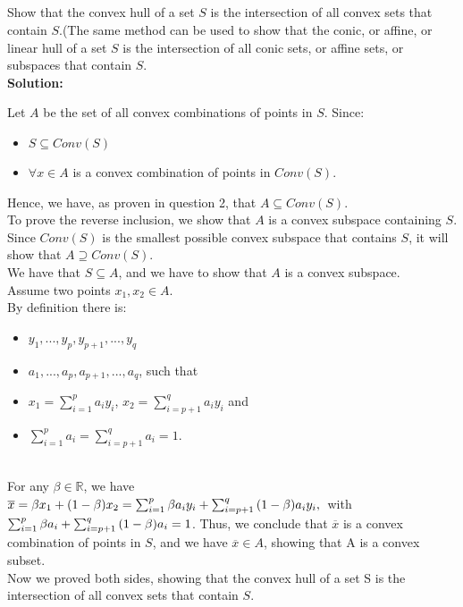\documentclass[10pt]{article}
\newcommand{\R}{\mathbb{R}}
\begin{document}
  	\begin{center}
  	\section{}
  	\end{center}\par
  	  	Show that the convex hull of a set $S$ is the intersection of all convex sets that contain
$S$.(The same method can be used to show that the conic, or affine, or linear hull of a set $S$ is
the intersection of all conic sets, or affine sets, or subspaces that contain $S$.\\
  	\textbf{Solution:}\par
  	Let $A$ be the set of all convex combinations of points in $S$. Since: \\
  	\begin{itemize}
  	\item $S \subseteq Conv(S)$ \\
  	 \item $\forall x \in A$  is a convex combination of points in $Conv(S)$. \\
  	 \end{itemize}
  	 Hence, we have, as proven in question 2, that $A \subseteq Conv(S)$. \\
  	 To prove the reverse inclusion, we show that $A$ is a convex subspace containing $S$. Since $Conv(S)$ is the smallest possible convex subspace that contains $S$, it will show that $A \supseteq Conv(S)$. \\
  	 We have that $S \subseteq A$, and we have to show that $A$ is a convex subspace. \\
  	 Assume two points $x_1, x_2 \in A$. \\
  	 By definition there is: \\
  	 	\begin{itemize}
  	\item $y_1, ..., y_p, y_{p+1}, ..., y_q$\\
  	 \item $a_1, ..., a_p, a_{p+1}, ..., a_q$, such that \\
  	 \item $x_1 = \sum_{i=1}^{p}{a_i}{y_i}$, \quad $x_2 = \sum_{i=p+1}^{q}{a_i}{y_i}$ \quad and \\
  	 \item $\sum_{i=1}^{p}{a_i} = \sum_{i=p+1}^{q}{a_i} =1. $
  	 \end{itemize} 
  	 \\
  	 For any $\beta \in \R$, we have \\
  	 \quad $\overline{x} = \beta x_1 + (1 - \beta) x_2  = \sum_{i=1}^{p}{\beta a_i y_i} + \sum_{i=p+1}^{q}{(1-\beta) a_i y_i},\\ $
  	 with $\sum_{i=1}^{p}{\beta a_i } + \sum_{i=p+1}^{q}{(1-\beta) a_i} = 1 \\ $. 
  	 Thus, we conclude that $\overline{x}$ is a convex combination of points in $S$, and we have $\overline{x} \in A$, showing that A is a convex subset. \\
  	 Now we proved both sides, showing that the convex hull  of a set S is the intersection of all convex sets that contain $S$.
  	\newpage
  	
\end{document}
